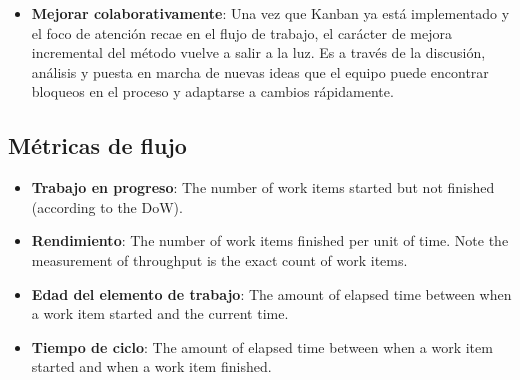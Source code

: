 \begin{itemize}
    \item \textbf{Mejorar colaborativamente}: %
    Una vez que Kanban ya está implementado y el foco de atención recae en el
    flujo de trabajo, el carácter de mejora incremental del método vuelve a
    salir a la luz. Es a través de la discusión, análisis y puesta en marcha de
    nuevas ideas que el equipo puede encontrar bloqueos en el proceso y
    adaptarse a cambios rápidamente.
\end{itemize}

\subsection{Métricas de flujo}

\begin{itemize}
    \item \textbf{Trabajo en progreso}: The number of work items started but not finished
    (according to the DoW).
    \item \textbf{Rendimiento}: The number of work items finished per unit of
    time. Note the measurement of throughput is the exact count of work items.
    \item \textbf{Edad del elemento de trabajo}: The amount of elapsed time between when a work
    item started and the current time.
    \item \textbf{Tiempo de ciclo}: The amount of elapsed time between when a work
    item started and when a work item finished.
\end{itemize}

